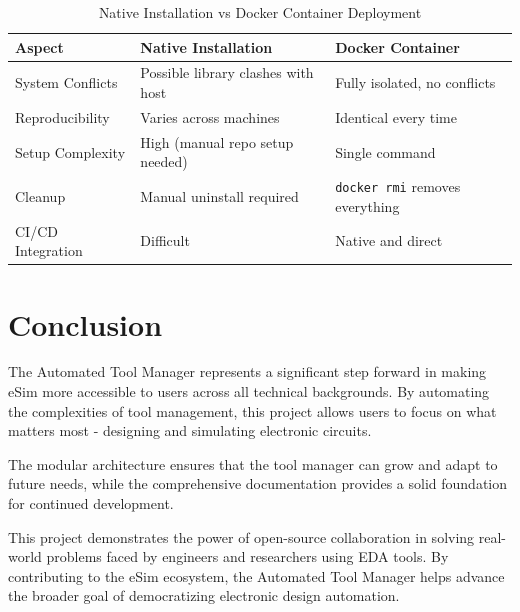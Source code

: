 \documentclass[12pt,a4paper]{report}
\begin{document}
\begin{table}[H]
    \centering
    \begin{tabular}{|p{4cm}|p{5cm}|p{5cm}|}
        \hline
        \textbf{Aspect} & \textbf{Native Installation} & \textbf{Docker Container} \\
        \hline
        System Conflicts & Possible library clashes with host & Fully isolated, no conflicts \\
        \hline
        Reproducibility & Varies across machines & Identical every time \\
        \hline
        Setup Complexity & High (manual repo setup needed) & Single command \\
        \hline
        Cleanup & Manual uninstall required & \texttt{docker rmi} removes everything \\
        \hline
        CI/CD Integration & Difficult & Native and direct \\
        \hline
    \end{tabular}
    \caption{Native Installation vs Docker Container Deployment}
    \label{tab:docker_comparison}
\end{table}

\chapter{Conclusion}

The Automated Tool Manager represents a significant step forward in making eSim more accessible to users across all technical backgrounds. By automating the complexities of tool management, this project allows users to focus on what matters most - designing and simulating electronic circuits.

The modular architecture ensures that the tool manager can grow and adapt to future needs, while the comprehensive documentation provides a solid foundation for continued development.

This project demonstrates the power of open-source collaboration in solving real-world problems faced by engineers and researchers using EDA tools. By contributing to the eSim ecosystem, the Automated Tool Manager helps advance the broader goal of democratizing electronic design automation.

\end{document}
